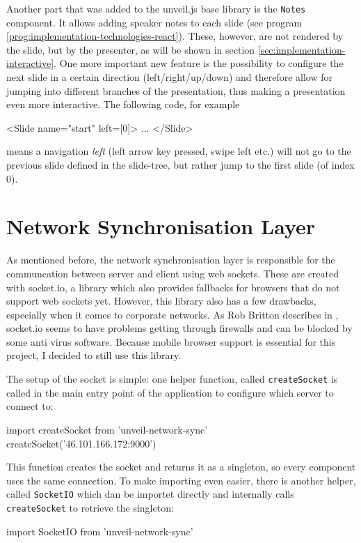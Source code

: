 Another part that was added to the unveil.js base library is the \texttt{Notes} component. It allows adding speaker notes to each slide (see program \ref{prog:implementation-technologies-react}). These, however, are not rendered by the slide, but by the presenter, as will be shown in section \ref{sec:implementation-interactive}. One more important new feature is the possibility to configure the next slide in a certain direction (left/right/up/down) and therefore allow for jumping into different branches of the presentation, thus making a presentation even more interactive. The following code, for example
%
\begin{JsCode}
  <Slide name="start" left={[0]}>
    ...
  </Slide>
\end{JsCode}
%
means a navigation \emph{left} (left arrow key pressed, swipe left etc.) will not go to the previous slide defined in the slide-tree, but rather jump to the first slide (of index $0$).


\section{Network Synchronisation Layer}
\label{sec:implementation-network-sync}
As mentioned before, the network synchronisation layer is responsible for the communcation between server and client using web sockets. These are created with socket.io, a library which also provides fallbacks for browsers that do not support web sockets yet. However, this library also has a few drawbacks, especially when it comes to corporate networks. As Rob Britton describes in \cite{socketio-problems}, socket.io seems to have problems getting through firewalls and can be blocked by some anti virus software.
Because mobile browser support is essential for this project, I decided to still use this library.

The setup of the socket is simple: one helper function, called \texttt{createSocket} is called in the main entry point of the application to configure which server to connect to:
%
\begin{JsCode}
import { createSocket } from 'unveil-network-sync'
createSocket('46.101.166.172:9000')
\end{JsCode}
%
This function creates the socket and returns it as a singleton, so every component uses the same connection. To make importing even easier, there is another helper, called \texttt{SocketIO} which dan be importet directly and internally calls \texttt{createSocket} to retrieve the singleton:
%
\begin{JsCode}
import { SocketIO } from 'unveil-network-sync'
\end{JsCode}
%


